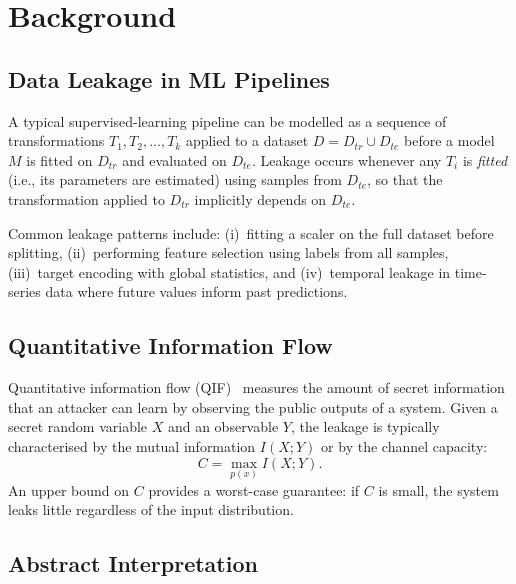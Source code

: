 \documentclass[11pt]{article}
\begin{document}
\section{Background}\label{sec:background}

\subsection{Data Leakage in ML Pipelines}

A typical supervised-learning pipeline can be modelled as a sequence
of transformations $T_1, T_2, \ldots, T_k$ applied to a dataset
$D = D_{\mathit{tr}} \cup D_{\mathit{te}}$ before a model $M$ is
fitted on $D_{\mathit{tr}}$ and evaluated on $D_{\mathit{te}}$.
Leakage occurs whenever any $T_i$ is \emph{fitted} (i.e., its
parameters are estimated) using samples from $D_{\mathit{te}}$, so
that the transformation applied to $D_{\mathit{tr}}$ implicitly
depends on $D_{\mathit{te}}$.

Common leakage patterns include: (i)~fitting a scaler on the full
dataset before splitting, (ii)~performing feature selection using
labels from all samples, (iii)~target encoding with global
statistics, and (iv)~temporal leakage in time-series data where
future values inform past predictions.

\subsection{Quantitative Information Flow}

Quantitative information flow (QIF)~\cite{smith2009,clark2007}
measures the amount of secret information that an attacker can learn
by observing the public outputs of a system.  Given a secret random
variable $X$ and an observable $Y$, the leakage is typically
characterised by the mutual information $I(X;Y)$ or by the channel
capacity:
\begin{equation}\label{eq:capacity}
  C = \max_{p(x)} I(X;Y).
\end{equation}
An upper bound on $C$ provides a worst-case guarantee: if $C$ is
small, the system leaks little regardless of the input distribution.

\subsection{Abstract Interpretation}
\end{document}
